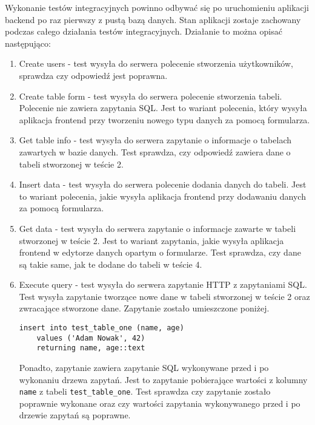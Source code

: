 \FloatBarrier

Wykonanie testów integracyjnych powinno odbywać się po uruchomieniu aplikacji
backend po raz pierwszy z pustą bazą danych. Stan aplikacji zostaje zachowany
podczas całego działania testów integracyjnych. Działanie to można opisać
następująco:

\begin{enumerate}

    \item Create users - test wysyła do serwera polecenie stworzenia
        użytkowników, sprawdza czy odpowiedź jest poprawna.

    \item Create table form - test wysyła do serwera polecenie stworzenia
        tabeli. Polecenie nie zawiera zapytania SQL. Jest to wariant polecenia,
        który wysyła aplikacja frontend przy tworzeniu nowego typu danych za
        pomocą formularza.

    \item Get table info - test wysyła do serwera zapytanie o informacje o
        tabelach zawartych w bazie danych. Test sprawdza, czy odpowiedź zawiera
        dane o tabeli stworzonej w teście 2.

    \item Insert data - test wysyła do serwera polecenie dodania danych do
        tabeli. Jest to wariant polecenia, jakie wysyła aplikacja frontend przy
        dodawaniu danych za pomocą formularza.

    \item Get data - test wysyła do serwera zapytanie o informacje zawarte w
        tabeli stworzonej w teście 2. Jest to wariant zapytania, jakie wysyła
        aplikacja frontend w edytorze danych opartym o formularze. Test
        sprawdza, czy dane są takie same, jak te dodane do tabeli w teście 4.

    \item Execute query - test wysyła do serwera zapytanie HTTP z zapytaniami
        SQL. Test wysyła zapytanie tworzące nowe dane w tabeli stworzonej w
        teście 2 oraz zwracające stworzone dane. Zapytanie zostało umieszczone
        poniżej.

        \begin{verbatim}
insert into test_table_one (name, age)
    values ('Adam Nowak', 42)
    returning name, age::text
        \end{verbatim}

        Ponadto, zapytanie zawiera zapytanie SQL wykonywane przed i po wykonaniu
        drzewa zapytań. Jest to zapytanie pobierające wartości z kolumny
        \verb|name| z tabeli \verb|test_table_one|. Test sprawdza czy zapytanie
        zostało poprawnie wykonane oraz czy wartości zapytania wykonywanego
        przed i po drzewie zapytań są poprawne.


\end{enumerate}
